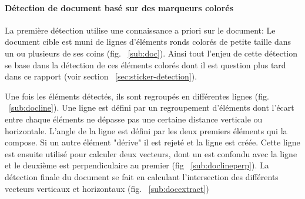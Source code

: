 \paragraph{Détection de document basé sur des marqueurs colorés} La première détection utilise une connaissance a priori sur le document: Le document cible est muni de lignes d'éléments ronds colorés de petite taille dans un ou plusieurs de ses coins (fig. ~\ref{sub:doc}). Ainsi tout l'enjeu de cette détection se base dans la détection de ces éléments colorés dont il est question plus tard dans ce rapport (voir section ~\ref{sec:sticker-detection}).

Une fois les éléments détectés, ils sont regroupés en différentes lignes (fig. ~\ref{sub:docline}).
Une ligne est défini par un regroupement d'éléments dont l'écart entre chaque éléments ne dépasse pas une certaine distance verticale ou horizontale. L'angle de la ligne est défini par les deux premiers éléments qui la compose. Si un autre élément "dérive" il est rejeté et la ligne est créée. Cette ligne est ensuite utilisé pour calculer deux vecteurs, dont un est confondu avec la ligne et le deuxième est perpendiculaire au premier (fig ~\ref{sub:doclineperp}).
La détection finale du document se fait en calculant l'intersection des différents vecteurs verticaux et horizontaux (fig. ~\ref{sub:docextract})

